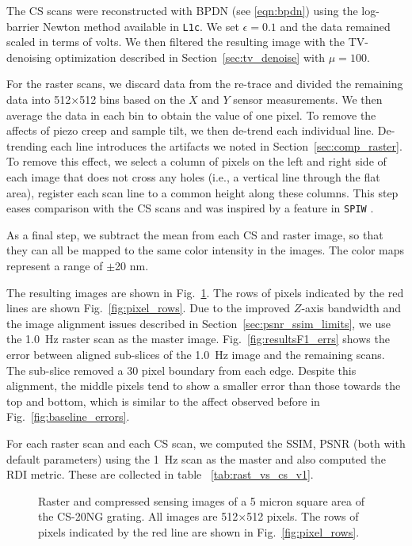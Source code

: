 \documentclass[twocolumn,twoside]{IEEEtran/IEEEtran}
\newcommand{\xc}{\ensuremath{X}\xspace}
\newcommand{\yc}{\ensuremath{Y}\xspace}
\begin{document}
The CS scans were reconstructed with BPDN (see \eqref{eqn:bpdn}) using the
log-barrier Newton method available in \texttt{L1c}\cite{L1c}. We set
$\epsilon = 0.1$ and the data remained scaled in terms of volts. We then
filtered the resulting image with the TV-denoising optimization described in
Section~\ref{sec:tv_denoise} with $\mu=100$.

For the raster scans, we discard data from the re-trace and divided the
remaining data into 512$\times$512 bins based on the \xc and \yc sensor
measurements. We then average the data in each bin to obtain the value of one
pixel. To remove the affects of piezo creep and sample tilt, we then de-trend
each individual line. De-trending each line introduces the artifacts we noted in
Section~\ref{sec:comp_raster}. To remove this effect, we select a column of
pixels on the left and right side of each image that does not cross any holes
(i.e., a vertical line through the flat area), register each scan line to a
common height along these columns. This step eases comparison with the CS scans
and was inspired by a feature in \texttt{SPIW} \cite{spiw}.

As a final step, we subtract the mean from each CS and raster image, so that
they can all be mapped to the same color intensity in the images. The color maps
represent a range of $\pm$20 nm.


The resulting images are shown in Fig.~\ref{fig:resultsF1_images}. The rows of
pixels indicated by the red lines are shown Fig.~\ref{fig:pixel_rows}. Due to
the improved $Z$-axis bandwidth and the image alignment issues described in
Section~\ref{sec:psnr_ssim_limits}, we use the 1.0~Hz raster scan as the master
image. Fig.~\ref{fig:resultsF1_errs} shows the error between aligned sub-slices
of the 1.0~Hz image and the remaining scans. The sub-slice removed a 30 pixel
boundary from each edge. Despite this alignment, the middle pixels tend to show
a smaller error than those towards the top and bottom, which is similar to the
affect observed before in Fig.~\ref{fig:baseline_errors}.

For each raster scan and each CS scan, we computed the SSIM, PSNR (both with
default parameters) using the 1~Hz scan as the master and also computed the RDI
metric. These are collected in table ~\ref{tab:rast_vs_cs_v1}.

\begin{figure}
  
  \caption{Raster and compressed sensing images of a 5 micron square area of the
    CS-20NG grating. All images are 512$\times$512 pixels. The rows of pixels
    indicated by the red line are shown in Fig.~\ref{fig:pixel_rows}.}
  \label{fig:resultsF1_images}
\end{figure}
\end{document}
